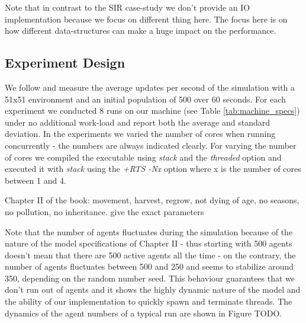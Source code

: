 Note that in contrast to the SIR case-study we don't provide an IO implementation because we focus on different thing here. The focus here is on how different data-structures can make a huge impact on the performance.

%

\subsection{Experiment Design}
We follow \cite{lysenko_framework_2008} and measure the average updates per second of the simulation with a 51x51 environment and an initial population of 500 over 60 seconds. For each experiment we conducted 8 runs on our machine (see Table \ref{tab:machine_specs}) under no additional work-load and report both the average and standard deviation. In the experiments we varied the number of cores when running concurrently - the numbers are always indicated clearly. For varying the number of cores we compiled the executable using \textit{stack} and the \textit{threaded} option and executed it with \textit{stack} using the \textit{+RTS -Nx} option where x is the number of cores between 1 and 4.

Chapter II of the book: movement, harvest, regrow, not dying of age, no seasons, no pollution, no inheritance. give the exact parameters

Note that the number of agents fluctuates during the simulation because of the nature of the model specifications of Chapter II - thus starting with 500 agents doesn't mean that there are 500 active agents all the time - on the contrary, the number of agents fluctuates between 500 and 250 and seems to stabilize around 350, depending on the random number seed. This behaviour guarantees that we don't run out of agents and it shows the highly dynamic nature of the model and the ability of our implementation to quickly spawn and terminate threads. The dynamics of the agent numbers of a typical run are shown in Figure TODO.  


